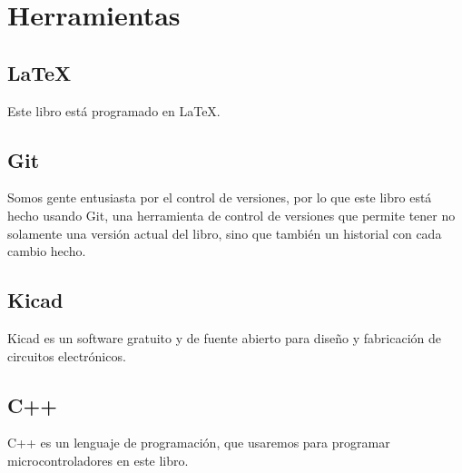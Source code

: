 \documentclass[../principal.tex]{subfiles}
\begin{document}

\section{Herramientas}

\subsection{LaTeX}

Este libro está programado en LaTeX.

\subsection{Git}

Somos gente entusiasta por el control de versiones, por lo que este libro está hecho usando Git, una herramienta de control de versiones que permite tener no solamente una versión actual del libro, sino que también un historial con cada cambio hecho.

\subsection{Kicad}

Kicad es un software gratuito y de fuente abierto para diseño y fabricación de circuitos electrónicos.

\subsection{C++}

C++ es un lenguaje de programación, que usaremos para programar microcontroladores en este libro.

\newpage
\end{document}
